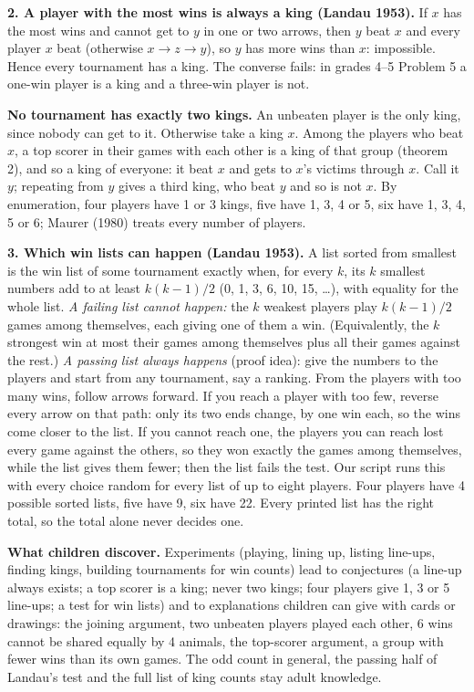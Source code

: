 \documentclass[11pt]{article}
\begin{document}
\textbf{2. A player with the most wins is always a king (Landau 1953).} If $x$ has the most wins and cannot get to $y$ in one or two arrows, then $y$ beat $x$ and every player $x$ beat (otherwise $x\to z\to y$), so $y$ has more wins than $x$: impossible. Hence every tournament has a king. The converse fails: in grades 4--5 Problem 5 a one-win player is a king and a three-win player is not.

\textbf{No tournament has exactly two kings.} An unbeaten player is the only king, since nobody can get to it. Otherwise take a king $x$. Among the players who beat $x$, a top scorer in their games with each other is a king of that group (theorem 2), and so a king of everyone: it beat $x$ and gets to $x$'s victims through $x$. Call it $y$; repeating from $y$ gives a third king, who beat $y$ and so is not $x$. By enumeration, four players have 1 or 3 kings, five have 1, 3, 4 or 5, six have 1, 3, 4, 5 or 6; Maurer (1980) treats every number of players.

\textbf{3. Which win lists can happen (Landau 1953).} A list sorted from smallest is the win list of some tournament exactly when, for every $k$, its $k$ smallest numbers add to at least $k(k-1)/2$ (0, 1, 3, 6, 10, 15, \dots), with equality for the whole list. \emph{A failing list cannot happen:} the $k$ weakest players play $k(k-1)/2$ games among themselves, each giving one of them a win. (Equivalently, the $k$ strongest win at most their games among themselves plus all their games against the rest.) \emph{A passing list always happens} (proof idea): give the numbers to the players and start from any tournament, say a ranking. From the players with too many wins, follow arrows forward. If you reach a player with too few, reverse every arrow on that path: only its two ends change, by one win each, so the wins come closer to the list. If you cannot reach one, the players you can reach lost every game against the others, so they won exactly the games among themselves, while the list gives them fewer; then the list fails the test. Our script runs this with every choice random for every list of up to eight players. Four players have 4 possible sorted lists, five have 9, six have 22. Every printed list has the right total, so the total alone never decides one.

\textbf{What children discover.} Experiments (playing, lining up, listing line-ups, finding kings, building tournaments for win counts) lead to conjectures (a line-up always exists; a top scorer is a king; never two kings; four players give 1, 3 or 5 line-ups; a test for win lists) and to explanations children can give with cards or drawings: the joining argument, two unbeaten players played each other, 6 wins cannot be shared equally by 4 animals, the top-scorer argument, a group with fewer wins than its own games. The odd count in general, the passing half of Landau's test and the full list of king counts stay adult knowledge.
\end{document}
